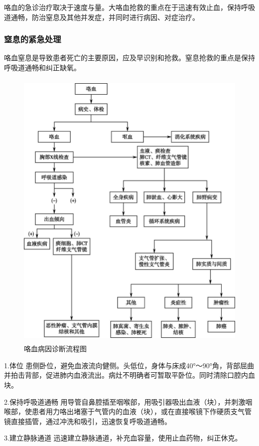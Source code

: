 咯血的急诊治疗取决于速度与量。大咯血抢救的重点在于迅速有效止血，保持呼吸道通畅，防治窒息及其他并发症，并同时进行病因、对症治疗。

\subsubsection{窒息的紧急处理}

咯血窒息是导致患者死亡的主要原因，应及早识别和抢救。窒息抢救的重点是保持呼吸道通畅和纠正缺氧。

\begin{figure}[!htbp]
 \centering
 \includegraphics[width=4.55208in,height=5.47917in]{./images/Image00048.jpg}
 \captionsetup{justification=centering}
 \caption{咯血病因诊断流程图}
 \label{fig9-1}
  \end{figure} 

1.体位
患侧卧位，避免血液流向健侧。头低位，身体与床成40°～90°角，背部屈曲并拍击背部，促进肺内血液流出。病灶不明确者可暂取平卧位。同时清除口腔内血块。

2.保持呼吸道通畅
用导管自鼻腔插至咽喉部，用吸引器吸出血液（块），并刺激咽喉部，使患者用力咯出堵塞于气管内的血液（块），或在直接喉镜下作硬质支气管镜直接插管，通过冲洗和吸引，迅速恢复呼吸道通畅。

3.建立静脉通道 迅速建立静脉通道，补充血容量，使用止血药物，纠正休克。


